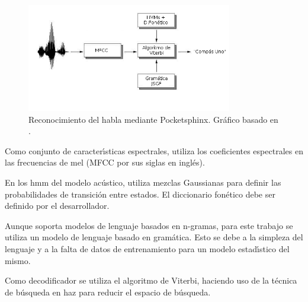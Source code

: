 \begin{figure}[H] 
\centering
\includegraphics[width=0.8\textwidth]{./graphics/pocketsphinx.png}
\caption{Reconocimiento del habla mediante Pocketsphinx. Gr\'afico basado en \cite{VerenichASR}.}
\label{figure:hmm}
\end{figure}

Como conjunto de caracter{\'\i}sticas espectrales,  utiliza los coeficientes espectrales
en las frecuencias de mel (MFCC por sus siglas en ingl\'es).

En los \gls{hmm} del modelo ac\'ustico, utiliza mezclas Gaussianas para definir las probabilidades de transici\'on
entre estados. El diccionario fon\'etico debe ser definido por el desarrollador.

Aunque  soporta modelos de lenguaje basados en n-gramas, para este trabajo se utiliza
un modelo de lenguaje basado en gram\'atica. Esto se debe a la simpleza del lenguaje y a la falta de datos
de entrenamiento para un modelo estad{\'\i}stico del mismo.

Como decodificador se utiliza el algoritmo de Viterbi, haciendo uso de la t\'ecnica de b\'usqueda en haz
para reducir el espacio de b\'usqueda.
